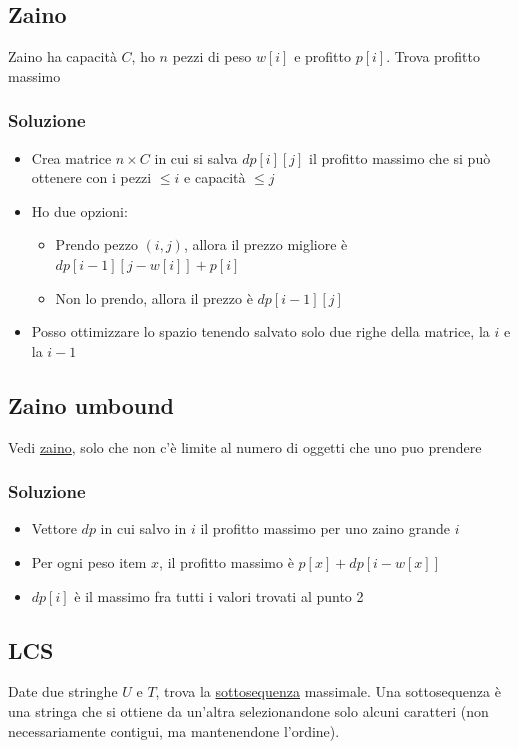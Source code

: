 \subsection{Zaino}\label{zaino}
Zaino ha capacità $ C $, ho $ n $ pezzi di peso $ w\left[i\right] $ e profitto $ p\left[i\right] $. Trova profitto massimo

\subsubsection{Soluzione}
\begin{itemize}
	\item Crea matrice $ n \times C $ in cui si salva $ dp\left[i\right]\left[j\right] $ il profitto massimo che si può ottenere con i pezzi $ \le i $ e capacità $ \le j $
	\item Ho due opzioni:
	      \begin{itemize}
		      \item Prendo pezzo $ \left(i,j\right) $, allora il prezzo migliore è $ dp\left[i-1\right]\left[j - w\left[i\right]\right] + p\left[i\right] $
		      \item Non lo prendo, allora il prezzo è $ dp\left[i-1\right]\left[j\right] $
	      \end{itemize}
	\item Posso ottimizzare lo spazio tenendo salvato solo due righe della matrice, la $ i $ e la $ i-1 $
\end{itemize}
\subsection{Zaino umbound}
Vedi \hyperref[zaino]{zaino}, solo che non c'è limite al numero di oggetti che uno puo prendere

\subsubsection{Soluzione}
\begin{itemize}
	\item Vettore $ dp $ in cui salvo in $ i $ il profitto massimo per uno zaino grande $ i $
	\item Per ogni peso item $ x $, il profitto massimo è $ p\left[x\right] + dp\left[i - w\left[x\right]\right] $
	\item $ dp\left[i\right] $ è il massimo fra tutti i valori trovati al punto 2
\end{itemize}
\subsection{LCS}
Date due stringhe $ U $ e $ T $, trova la \underline{sottosequenza} massimale. Una sottosequenza è una stringa che si ottiene da un'altra selezionandone solo alcuni caratteri (non necessariamente contigui, ma mantenendone l'ordine).
